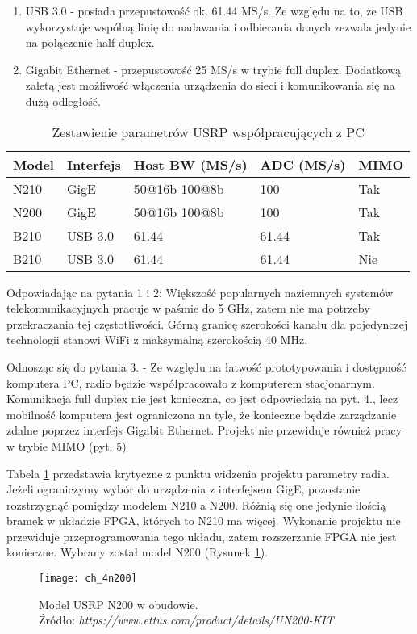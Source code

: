 \begin{enumerate}
\item USB 3.0 - posiada przepustowość ok. 61.44 MS/s.
Ze względu na to, że USB wykorzystuje wspólną linię do nadawania i odbierania danych zezwala jedynie na połączenie half duplex.
\item Gigabit Ethernet - przepustowość 25 MS/s w trybie full duplex. Dodatkową zaletą jest możliwość włączenia urządzenia do sieci i komunikowania się na dużą odległość.
\end{enumerate}

\begin{table}[t]
\caption{Zestawienie parametrów USRP współpracujących z PC}
\label{usrp_table}
\centering
\begin{tabular}{|l|l|l|l|l|}
\hline
Model & Interfejs & Host BW (MS/s) & ADC (MS/s) & MIMO \\
\hline
N210 & GigE & 50@16b 100@8b  & 100 & Tak \\
\hline
N200 & GigE & 50@16b 100@8b  & 100 & Tak \\
\hline
B210 & USB 3.0 & 61.44 & 61.44 & Tak \\
\hline
B210 & USB 3.0 & 61.44 & 61.44 & Nie \\
\hline
\end{tabular}
\end{table}


Odpowiadając na pytania 1 i 2: Większość popularnych naziemnych systemów telekomunikacyjnych pracuje w paśmie do 5 GHz, zatem nie ma potrzeby przekraczania tej częstotliwości. Górną granicę szerokości kanału dla pojedynczej technologii stanowi WiFi z maksymalną szerokością 40 MHz. \cite{802.11}

Odnosząc się do pytania 3. - Ze względu na łatwość prototypowania i dostępność komputera PC, radio będzie współpracowało z komputerem stacjonarnym. Komunikacja full duplex nie jest konieczna, co jest odpowiedzią na pyt. 4., lecz mobilność komputera jest ograniczona na tyle, że konieczne będzie zarządzanie zdalne poprzez interfejs Gigabit Ethernet. Projekt nie przewiduje również pracy w trybie MIMO (pyt. 5)

Tabela \ref{usrp_table} przedstawia krytyczne z punktu widzenia projektu parametry radia. Jeżeli ograniczymy wybór do urządzenia z interfejsem GigE, pozostanie rozstrzygnąć pomiędzy modelem N210 a N200. Różnią się one jedynie ilością bramek w układzie FPGA, których to N210 ma więcej. Wykonanie projektu nie przewiduje przeprogramowania tego układu, zatem rozszerzanie FPGA nie jest konieczne. Wybrany został model N200 (Rysunek \ref{n200}).

\begin{figure}[t]
\texttt{[image: ch\_4n200]}
\centering
\caption[Model USRP N200 w obudowie.; Źródło: \textit{https://www.ettus.com/product/details/UN200-KIT}]{Model USRP N200 w obudowie. \\ Źródło: \textit{https://www.ettus.com/product/details/UN200-KIT}\endtabular}
\label{n200}
\end{figure}



        


